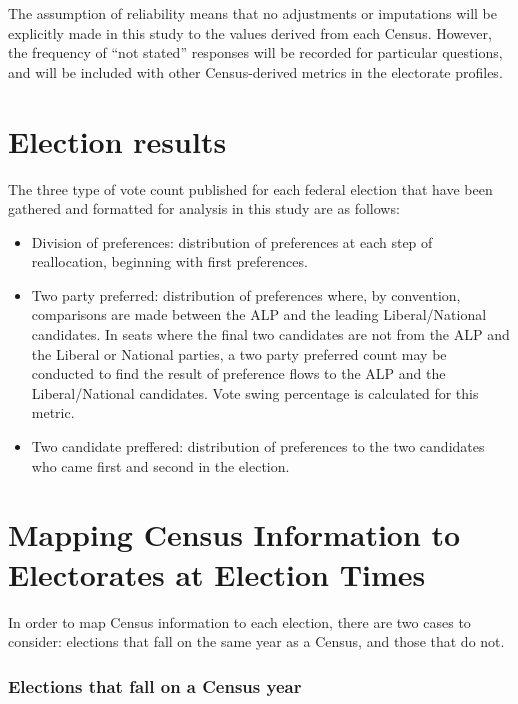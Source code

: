 \documentclass{monashthesis}
\begin{document}
The assumption of reliability means that no adjustments or imputations
will be explicitly made in this study to the values derived from each
Census. However, the frequency of ``not stated'' responses will be
recorded for particular questions, and will be included with other
Census-derived metrics in the electorate profiles.

\section{Election results}\label{election-results}

The three type of vote count published for each federal election that
have been gathered and formatted for analysis in this study are as
follows:

\begin{itemize}
\item
  Division of preferences: distribution of preferences at each step of
  reallocation, beginning with first preferences.
\item
  Two party preferred: distribution of preferences where, by convention,
  comparisons are made between the ALP and the leading Liberal/National
  candidates. In seats where the final two candidates are not from the
  ALP and the Liberal or National parties, a two party preferred count
  may be conducted to find the result of preference flows to the ALP and
  the Liberal/National candidates. Vote swing percentage is calculated
  for this metric.
\item
  Two candidate preffered: distribution of preferences to the two
  candidates who came first and second in the election.
\end{itemize}

\section{Mapping Census Information to Electorates at Election
Times}\label{mapping-census-information-to-electorates-at-election-times}

In order to map Census information to each election, there are two cases
to consider: elections that fall on the same year as a Census, and those
that do not.

\subsubsection{Elections that fall on a Census
year}\label{elections-that-fall-on-a-census-year}
\end{document}

